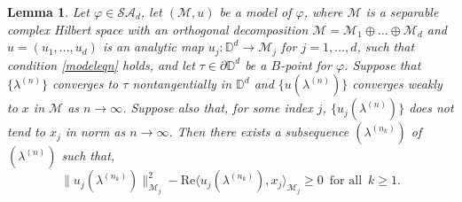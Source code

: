\documentclass[11pt, reqno]{amsart}
\newtheorem{lemma}[theorem]{Lemma}
\newcommand\1{\boldsymbol {1}}
\numberwithin{equation}{section}
\begin{document}
\begin{lemma}\label{ujnotxj}
Let $\varphi\in\mathcal{SA}_{d}$, let $(\mathcal{M},u)$ be a model of $\varphi$, where  $\mathcal{M}$ is a separable complex Hilbert space with an orthogonal decomposition $\mathcal{M}=\mathcal{M}_{1}\oplus\hdots\oplus\mathcal{M}_{d}$ and $u=(u_1, \dots, u_d)$ is an analytic map  $u_j: \mathbb{D}^{d} \to \mathcal{M}_{j} $ for $j =1, \dots, d$, such that condition 
\eqref{modeleqn}    holds, and let $\tau\in\partial\mathbb{D}^{d}$ be a $B$-point for $\varphi$. Suppose that $\{\lambda^{(n)}\}$ converges to $\tau$ nontangentially in $\mathbb{D}^{d}$ and $\{u(\lambda^{(n)})\}$ converges weakly to $x$ in $\mathcal{M}$ as $n\rightarrow \infty$.
Suppose also that, for some index $j$,  $\{u_j(\lambda^{(n)})\}$ does not tend to $x_j$  in norm as $n\rightarrow \infty$.
Then there exists a   subsequence $(\lambda^{(n_k)})$ of $(\lambda^{(n)})$ such that, 
\begin{equation} \label{lemma-uj-0}  \|u_{j}(\lambda^{(n_k)})\|_{\mathcal{M}_{j}}^{2}-\mathrm{Re} \langle u_{j}(\lambda^{(n_k)}),x_{j}\rangle_{\mathcal{M}_{j}} \geq 0 \;\ \text{for all} \; \ k \ge 1.
\end{equation}
\end{lemma}
\end{document}

